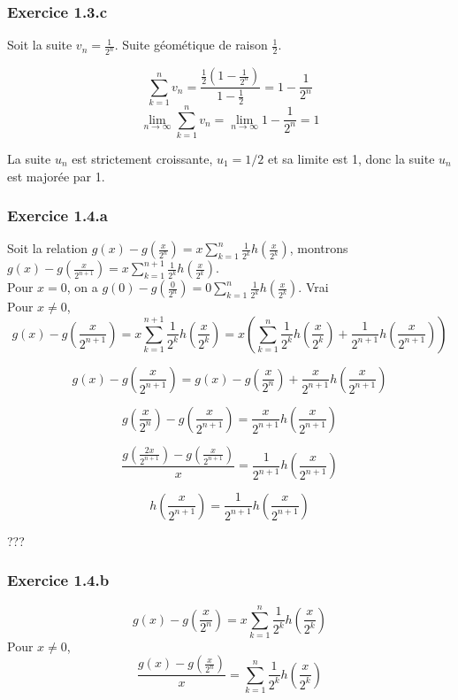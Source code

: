 \documentclass[]{book}
\theoremstyle{definition}
\begin{document}
\subsubsection*{Exercice 1.3.c}
Soit la suite $v_{n} = \frac{1}{2^n}$. Suite g\'eom\'etique de raison $\frac{1}{2}$.

$$\sum_{k=1}^{n} v_n = \frac{\frac{1}{2}(1-\frac{1}{2^n})}{1-\frac{1}{2}} = 1-\frac{1}{2^n}$$
$$\lim_{n \to \infty} \sum_{k=1}^{n} v_n = \lim_{n \to \infty} 1-\frac{1}{2^n} = 1$$

La suite $u_n$ est strictement croissante, $u_1=1/2$ et sa limite est 1, donc la suite $u_n$ est major\'ee par 1.


\subsubsection*{Exercice 1.4.a}
Soit la relation $g(x) - g(\frac{x}{2^n}) = x\sum_{k=1}^{n} {\frac{1}{2^k}h\left(\frac{x}{2^k}\right)}$, montrons $g(x) - g(\frac{x}{2^{n+1}}) = x\sum_{k=1}^{n+1} {\frac{1}{2^k}h\left(\frac{x}{2^k}\right)}$.\\
Pour $x=0$, on a $g(0)- g(\frac{0}{2^n}) = 0\sum_{k=1}^{n} {\frac{1}{2^k}h\left(\frac{x}{2^k}\right)}$. Vrai\\

Pour $x \neq 0$,
$$g(x) - g(\frac{x}{2^{n+1}}) = x\sum_{k=1}^{n+1} {\frac{1}{2^k}h\left(\frac{x}{2^k}\right)} = x\left(\sum_{k=1}^{n} {\frac{1}{2^k}h\left(\frac{x}{2^k}\right)} + \frac{1}{2^{n+1}}h\left(\frac{x}{2^{n+1}}\right)\right)$$

$$g(x) - g(\frac{x}{2^{n+1}}) = g(x) - g(\frac{x}{2^{n}}) + \frac{x}{2^{n+1}}h\left(\frac{x}{2^{n+1}}\right)$$

$$ g(\frac{x}{2^{n}}) - g(\frac{x}{2^{n+1}}) = \frac{x}{2^{n+1}}h\left(\frac{x}{2^{n+1}}\right)$$

$$ \frac{g(\frac{2x}{2^{n+1}}) - g(\frac{x}{2^{n+1}})}{x} = \frac{1}{2^{n+1}}h\left(\frac{x}{2^{n+1}}\right)$$

$$ h\left(\frac{x}{2^{n+1}}\right) = \frac{1}{2^{n+1}}h\left(\frac{x}{2^{n+1}}\right)$$


???\\

\subsubsection*{Exercice 1.4.b}
$$g(x) - g(\frac{x}{2^n}) = x\sum_{k=1}^{n} {\frac{1}{2^k}h\left(\frac{x}{2^k}\right)}$$
Pour $x \neq 0$, 
$$\frac{g(x) - g(\frac{x}{2^n})}{x} = \sum_{k=1}^{n} {\frac{1}{2^k}h\left(\frac{x}{2^k}\right)}$$
\end{document}

